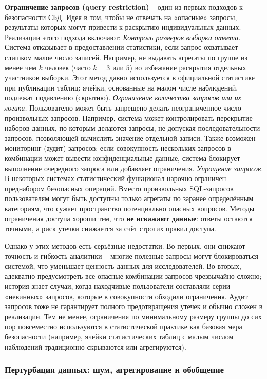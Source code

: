 \textbf{Ограничение запросов (query restriction)} – один из первых подходов к безопасности
СБД. Идея в том, чтобы не отвечать на «опасные» запросы, результаты которых могут привести
к раскрытию индивидуальных данных. Реализации этого подхода включают: \textit{Контроль
размеров выборки ответа.} Система отказывает в предоставлении статистики, если запрос
охватывает слишком малое число записей. Например, не выдавать агрегаты по группе из менее
чем $k$ человек (часто $k=3$ или $5$) во избежание раскрытия отдельных участников выборки.
Этот метод давно используется в официальной статистике при публикации таблиц: ячейки,
основанные на малом числе наблюдений, подлежат подавлению (скрытию). \textit{Ограничение
количества запросов или их логики.} Пользователю может быть запрещено делать
неограниченное число произвольных запросов. Например, система может контролировать
перекрытие наборов данных, по которым делаются запросы, не допуская последовательности
запросов, позволяющей вычислить значение отдельной записи. Также возможен мониторинг
(аудит) запросов: если совокупность нескольких запросов в комбинации может вывести
конфиденциальные данные, система блокирует выполнение очередного запроса или добавляет
ограничения. \textit{Упрощение запросов.} В некоторых системах статистический функционал
нарочно ограничен преднабором безопасных операций. Вместо произвольных SQL-запросов
пользователям могут быть доступны только агрегаты по заранее определённым категориям, что
сужает пространство потенциально опасных вопросов. Методы ограничения доступа хороши тем,
что \textbf{не искажают данные}: ответы остаются точными, а риск утечки снижается за счёт
строгих правил доступа.

Однако у этих методов есть серьёзные недостатки. Во-первых, они снижают точность и
гибкость аналитики – многие полезные запросы могут блокироваться системой, что уменьшает
ценность данных для исследователей. Во-вторых, адекватно предусмотреть все опасные
комбинации запросов чрезвычайно сложно; история знает случаи, когда находчивые
пользователи составляли серии «невинных» запросов, которые в совокупности обходили
ограничения. Аудит запросов тоже не гарантирует полного предотвращения утечек и обычно
сложен в реализации. Тем не менее, ограничения по минимальному размеру группы до сих пор
повсеместно используются в статистической практике как базовая мера безопасности
(например, ячейки статистических таблиц с малым числом наблюдений традиционно скрываются
или агрегируются).

\subsubsection{Пертурбация данных: шум, агрегирование и обобщение}

